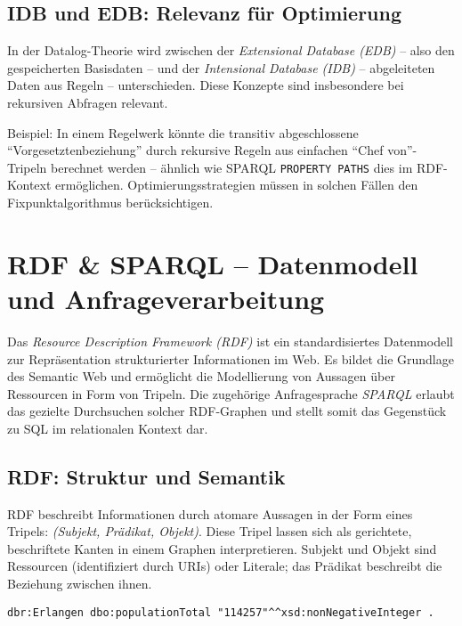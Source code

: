 \documentclass[12pt]{article}
\begin{document}
\subsection{IDB und EDB: Relevanz für Optimierung}

In der Datalog-Theorie wird zwischen der \emph{Extensional Database (EDB)} – also den gespeicherten Basisdaten – und der \emph{Intensional Database (IDB)} – abgeleiteten Daten aus Regeln – unterschieden. Diese Konzepte sind insbesondere bei rekursiven Abfragen relevant.

Beispiel: In einem Regelwerk könnte die transitiv abgeschlossene ``Vorgesetztenbeziehung'' durch rekursive Regeln aus einfachen ``Chef von''-Tripeln berechnet werden – ähnlich wie SPARQL \texttt{PROPERTY PATHS} dies im RDF-Kontext ermöglichen. Optimierungsstrategien müssen in solchen Fällen den Fixpunktalgorithmus berücksichtigen.

\section{RDF \& SPARQL – Datenmodell und Anfrageverarbeitung} \label{sec:rdf}

Das \textit{Resource Description Framework (RDF)} ist ein standardisiertes Datenmodell zur Repräsentation strukturierter Informationen im Web. Es bildet die Grundlage des Semantic Web und ermöglicht die Modellierung von Aussagen über Ressourcen in Form von Tripeln. Die zugehörige Anfragesprache \textit{SPARQL} erlaubt das gezielte Durchsuchen solcher RDF-Graphen und stellt somit das Gegenstück zu SQL im relationalen Kontext dar.

\subsection{RDF: Struktur und Semantik}

RDF beschreibt Informationen durch atomare Aussagen in der Form eines Tripels: \textit{(Subjekt, Prädikat, Objekt)}. Diese Tripel lassen sich als gerichtete, beschriftete Kanten in einem Graphen interpretieren. Subjekt und Objekt sind Ressourcen (identifiziert durch URIs) oder Literale; das Prädikat beschreibt die Beziehung zwischen ihnen.

\begin{lstlisting}[caption=Beispielhafte RDF-Repräsentation einer Einwohnerzahl]
dbr:Erlangen dbo:populationTotal "114257"^^xsd:nonNegativeInteger .
\end{lstlisting}
\end{document}
